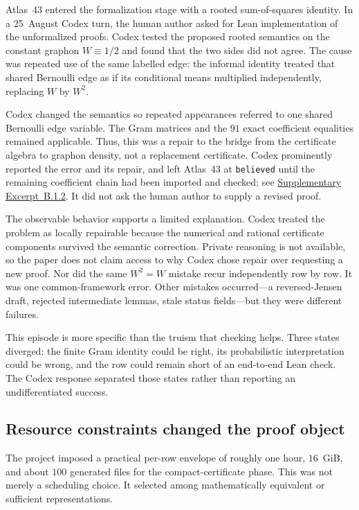 \documentclass[11pt]{article}
\newcommand{\excerptlink}[2]{\hyperref[ex:#1]{Supplementary Excerpt~#2}}
\begin{document}
Atlas~43 entered the formalization stage with a rooted sum-of-squares
identity.  In a 25~August Codex turn, the human author asked for Lean
implementation of the unformalized proofs.  Codex tested the proposed rooted
semantics on the constant graphon $W\equiv 1/2$ and found that the two sides
did not agree.  The cause was repeated use of the same labelled edge: the
informal identity treated that shared Bernoulli edge as if its conditional
means multiplied independently, replacing $W$ by $W^2$.

Codex changed the semantics so repeated appearances referred to one shared
Bernoulli edge variable.  The Gram matrices and the $91$ exact coefficient
equalities remained applicable.  Thus, this was a repair to the bridge from
the certificate algebra to graphon density, not a replacement certificate.
Codex prominently reported the error and its repair, and left Atlas~43 at
\texttt{believed} until the remaining coefficient chain had been imported and
checked; see \excerptlink{B12}{B.1.2}.  It did not ask the human author to
supply a revised proof.

The observable behavior supports a limited explanation.  Codex treated the
problem as locally repairable because the numerical and rational certificate
components survived the semantic correction.  Private reasoning is not
available, so the paper does not claim access to why Codex chose repair over
requesting a new proof.  Nor did the same $W^2=W$ mistake recur independently
row by row.  It was one common-framework error.  Other mistakes occurred---a
reversed-Jensen draft, rejected intermediate lemmas, stale status fields---but
they were different failures.

This episode is more specific than the truism that checking helps.  Three
states diverged: the finite Gram identity could be right, its probabilistic
interpretation could be wrong, and the row could remain short of an end-to-end
Lean check.  The Codex response separated those states rather than reporting
an undifferentiated success.

\subsection{Resource constraints changed the proof object}
\label{sec:resources}

The project imposed a practical per-row envelope of roughly one hour,
$16$~GiB, and about $100$ generated files for the compact-certificate phase.
This was not merely a scheduling choice.  It selected among mathematically
equivalent or sufficient representations.
\end{document}
